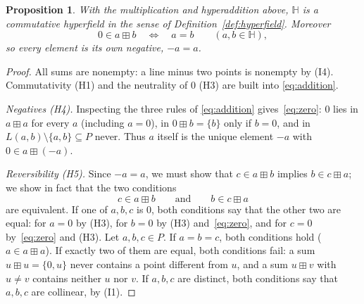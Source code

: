 \documentclass[12pt]{article}
\theoremstyle{plain}
\newtheorem{proposition}[theorem]{Proposition}
\theoremstyle{definition}
\newcommand{\Hh}{\mathbb{H}}
\newcommand{\bp}{\boxplus}
\begin{document}
\begin{proposition}\label{prop:hyperfield}
With the multiplication and hyperaddition above, $\Hh$ is a commutative
hyperfield in the sense of Definition~\ref{def:hyperfield}.  Moreover
\begin{equation}\label{eq:zero}
 0\in a\bp b\quad\Longleftrightarrow\quad a=b\qquad(a,b\in\Hh),
\end{equation}
so every element is its own negative, $-a=a$.
\end{proposition}
\begin{proof}
All sums are nonempty: a line minus two points is nonempty by (I4).
Commutativity (H1) and the neutrality of $0$ (H3) are built into
\eqref{eq:addition}.

\emph{Negatives (H4).}  Inspecting the three rules of
\eqref{eq:addition} gives~\eqref{eq:zero}: $0$ lies in $a\bp a$ for
every $a$ (including $a=0$), in $0\bp b=\{b\}$ only if $b=0$, and in
$L(a,b)\setminus\{a,b\}\subseteq P$ never.  Thus $a$ itself is the
unique element $-a$ with $0\in a\bp(-a)$.

\emph{Reversibility (H5).}  Since $-a=a$, we must show that
$c\in a\bp b$ implies $b\in c\bp a$; we show in fact that the two
conditions
\[
 c\in a\bp b\qquad\text{and}\qquad b\in c\bp a
\]
are equivalent.  If one of $a,b,c$ is $0$, both conditions say that the
other two are equal: for $a=0$ by (H3), for $b=0$ by (H3)
and~\eqref{eq:zero}, and for $c=0$ by~\eqref{eq:zero} and (H3).  Let
$a,b,c\in P$.  If $a=b=c$, both conditions hold ($a\in a\bp a$).  If
exactly two of them are equal, both conditions fail: a sum
$u\bp u=\{0,u\}$ never contains a point different from $u$, and a sum
$u\bp v$ with $u\neq v$ contains neither $u$ nor $v$.  If $a,b,c$ are
distinct, both conditions say that $a,b,c$ are collinear, by (I1).


\end{proof}
\end{document}
